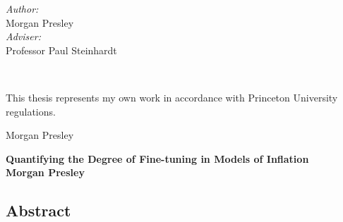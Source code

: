 \documentclass[a4paper,11pt]{article}
\begin{document}
\begin{titlepage}
\hfill
\begin{minipage}{0.5\textwidth}
\begin{flushright} \Large
\emph{Author:}\\
Morgan Presley\\[1cm] %
\emph{Adviser:} \\
Professor Paul Steinhardt\\[0.5cm]
\end{flushright}
\end{minipage}\\[4cm]

\vfill %

\end{titlepage}

\vspace*{8cm}
\noindent\normalsize This thesis represents my own work in accordance with Princeton University regulations.
\begin{figure}[H]
\begin{flushright}
\end{flushright}
\end{figure}
\vspace*{-1cm}
\begin{flushright}
Morgan Presley
\end{flushright}

\newpage
{}
\vspace*{1cm}
\begin{centering}
{\Large \bfseries Quantifying the Degree of Fine-tuning in Models of Inflation}\\[1cm]
{\normalsize \bfseries Morgan Presley}\\
\end{centering}
\subsection*{\normalsize Abstract}
\vspace{-1cm}
\vspace{0.5cm}
\renewcommand{\abstractname}{}    %
\begin{abstract}
\linespread{1.1}
\small Here is the text of the abstract! 
\end{abstract}
\end{document}
